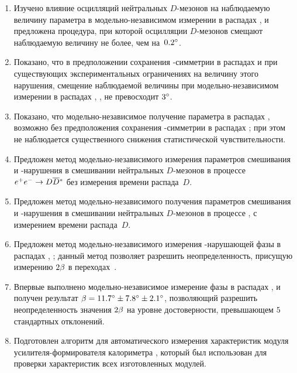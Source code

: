 \begin{enumerate}
  \item Изучено влияние осцилляций нейтральных $D$-мезонов на наблюдаемую величину параметра \gphi в модельно-независимом измерении в распадах \bdk, \dkpp и предложена процедура, при которой осцилляции $D$-мезонов смещают наблюдаемую величину не более, чем на~$0.2^{\circ}$.
  \item Показано, что в предположении сохранения \cpconj-симметрии в распадах \dnkpp и при существующих экспериментальных ограничениях на величину этого нарушения, смещение наблюдаемой величины \gphi при модельно-независимом измерении в распадах \bdk, \dkpp, не превосходит $3^{\circ}$.
  \item Показано, что модельно-независимое получение параметра \gphi в распадах \bdk, \dkpp возможно без предположения сохранения \cpconj-симметрии в распадах \dnkpp; при этом не наблюдается существенного снижения статистической чувствительности.
  \item Предложен метод модельно-независимого измерения параметров смешивания и \cpconj-нарушения в смешивании нейтральных $D$-мезонов в процессе $e^+e^-\to D\overline{D}{}^{*}$ без измерения времени распада~$D$.
  \item Предложен метод модельно-независимого получения параметров смешивания и \cpconj-нарушения в смешивании нейтральных $D$-мезонов в процессе \dstpdpip, \dnkpp с измерением времени распада~$D$.
  \item Предложен метод модельно-независимого измерения \cpconj-нарушающей фазы \pphi в распадах \bdsth, \dbkpp; данный метод позволяет разрешить неопределенность, присущую измерению $2\beta$ в переходах~\btoccs.
  \item Впервые выполнено модельно-независимое измерение фазы \pphi в распадах \bdsth, \dbkpp и получен результат $\beta = 11.7^{\circ}\pm7.8^{\circ}\pm2.1^{\circ}$, позволяющий разрешить неопределенность значения $2\beta$ на уровне достоверности, превышающем $5$ стандартных отклонений.
  \item Подготовлен алгоритм для автоматического измерения характеристик модуля усилителя-формирователя калориметра \belleii, который был использован для проверки характеристик всех изготовленных модулей.
\end{enumerate}
